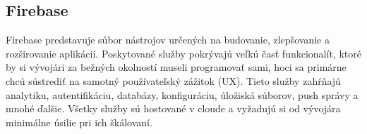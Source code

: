 
\subsection{Firebase}
Firebase predstavuje súbor nástrojov určených na budovanie, zlepšovanie a 
rozširovanie aplikácií. Poskytované služby pokrývajú veľkú časť funkcionalít,
ktoré by si vývojári za bežných okolností museli programovať sami, hoci sa primárne
chcú sústrediť na samotný používateľský zážitok (UX). Tieto služby zahŕňajú analytiku,
autentifikáciu, databázy, konfiguráciu, úložiská súborov, push správy a mnohé ďalšie. 
Všetky služby sú hostované v cloude a vyžadujú si od vývojára minimálne úsilie pri 
ich škálovaní.